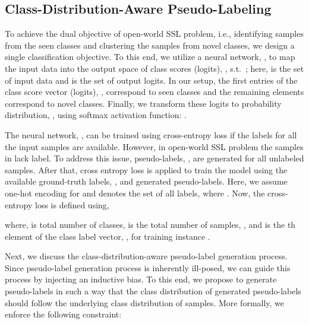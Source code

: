 \documentclass[runningheads]{eccv2022submission}
\begin{document}
\subsection{Class-Distribution-Aware Pseudo-Labeling}
\label{sec:equi-pl}

To achieve the dual objective of open-world SSL problem, i.e., identifying samples from the seen classes and clustering the samples from novel classes, we design a single classification objective. To this end, we utilize a neural network, , to map the input data  into the output space of class scores (logits), , s.t.\ ; here,  is the set of input data and  is the set of output logits. In our setup, the first  entries of the class score vector (logits), , correspond to seen classes and the remaining  elements correspond to novel classes. Finally, we transform these logits to probability distribution, , using softmax activation function: .


The neural network, , can be trained using cross-entropy loss if the labels for all the input samples are available. However, in open-world SSL problem the samples in  lack label. To address this issue, pseudo-labels, , are generated for all unlabeled samples. After that, cross entropy loss is  applied to train the model using the available ground-truth labels, , and generated pseudo-labels. Here, we assume one-hot encoding for  and  denotes the set of all labels, where . Now, the cross-entropy loss is defined using,


\setlength{\abovedisplayskip}{-6pt}
\setlength{\belowdisplayskip}{2pt}
\setlength{\abovedisplayshortskip}{0pt}
\setlength{\belowdisplayshortskip}{0pt}


where,  is total number of classes,  is the total number of samples, , and  is the th element of the class label vector, , for training instance .  

Next, we discuss the class-distribution-aware pseudo-label generation process. Since pseudo-label generation process is inherently ill-posed, we can guide this process by injecting an inductive bias. To this end, we propose to generate pseudo-labels in such a way that the class distribution of generated pseudo-labels should follow the underlying class distribution of samples. More formally, we enforce the following constraint: 

\setlength{\abovedisplayskip}{-6pt}
\setlength{\belowdisplayskip}{2pt}
\setlength{\abovedisplayshortskip}{0pt}
\setlength{\belowdisplayshortskip}{0pt}
\end{document}
